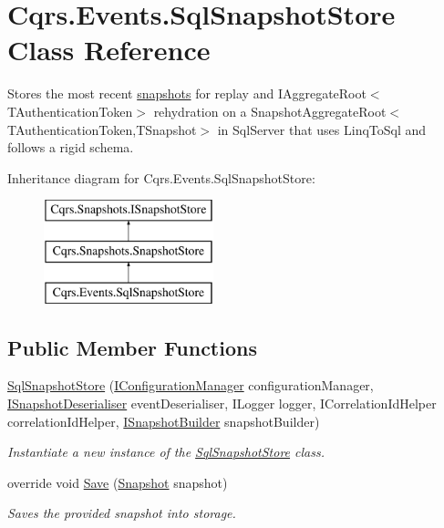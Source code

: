 \hypertarget{classCqrs_1_1Events_1_1SqlSnapshotStore}{}\section{Cqrs.\+Events.\+Sql\+Snapshot\+Store Class Reference}
\label{classCqrs_1_1Events_1_1SqlSnapshotStore}


Stores the most recent \hyperlink{}{snapshots} for replay and I\+Aggregate\+Root$<$\+T\+Authentication\+Token$>$ rehydration on a Snapshot\+Aggregate\+Root$<$\+T\+Authentication\+Token,\+T\+Snapshot$>$ in Sql\+Server that uses Linq\+To\+Sql and follows a rigid schema.  


Inheritance diagram for Cqrs.\+Events.\+Sql\+Snapshot\+Store\+:\begin{figure}[H]
\begin{center}
\leavevmode
\includegraphics[height=3.000000cm]{classCqrs_1_1Events_1_1SqlSnapshotStore}
\end{center}
\end{figure}
\subsection*{Public Member Functions}
\begin{DoxyCompactItemize}
\item 
\hyperlink{classCqrs_1_1Events_1_1SqlSnapshotStore_a9910cd3866ca4f226d5258479deefd12_a9910cd3866ca4f226d5258479deefd12}{Sql\+Snapshot\+Store} (\hyperlink{interfaceCqrs_1_1Configuration_1_1IConfigurationManager}{I\+Configuration\+Manager} configuration\+Manager, \hyperlink{interfaceCqrs_1_1Events_1_1ISnapshotDeserialiser}{I\+Snapshot\+Deserialiser} event\+Deserialiser, I\+Logger logger, I\+Correlation\+Id\+Helper correlation\+Id\+Helper, \hyperlink{interfaceCqrs_1_1Events_1_1ISnapshotBuilder}{I\+Snapshot\+Builder} snapshot\+Builder)
\begin{DoxyCompactList}\small\item\em Instantiate a new instance of the \hyperlink{classCqrs_1_1Events_1_1SqlSnapshotStore}{Sql\+Snapshot\+Store} class. \end{DoxyCompactList}\item 
override void \hyperlink{classCqrs_1_1Events_1_1SqlSnapshotStore_ae219c88f6d56fbceef7c738dae824666_ae219c88f6d56fbceef7c738dae824666}{Save} (\hyperlink{classCqrs_1_1Snapshots_1_1Snapshot}{Snapshot} snapshot)
\begin{DoxyCompactList}\small\item\em Saves the provided {\itshape snapshot}  into storage. \end{DoxyCompactList}\end{DoxyCompactItemize}
